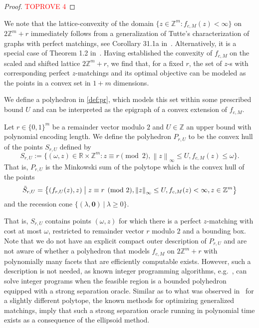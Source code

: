 \documentclass[a4paper,UKenglish,cleveref,thm-restate]{lipics-v2021}
\newcommand{\R}{\mathbb R}
\newcommand{\Z}{\mathbb Z}
\newcommand{\veczero}{\mathbf0}
\begin{document}
{\begin{proof}\textcolor{red}{TOPROVE 4}\end{proof}

We note that the lattice-convexity of the domain $\{z\in\Z^m\colon f_{c,M}(z)<\infty\}$ on $2\Z^m+r$ immediately follows from a generalization of Tutte's characterization of graphs with perfect matchings, see Corollary 31.1a in~\cite{schrijver2003combinatorial}. Alternatively, it is a special case of Theorem 1.2 in~\cite{DBLP:journals/jgt/AnsteeN99}. 
Having established the convexity of $f_{c,M}$ on the scaled and shifted lattice $2\Z^m+r$, we find that, for a fixed $r$, the set of $z$-s with corresponding perfect $z$-matchings and its optimal objective can be modeled as the points in a convex set in $1+m$ dimensions. 

}

We define a polyhedron in \cref{def:pr}, which models this set within some prescribed bound $U$ and can be interpreted as the epigraph of a convex extension of $f_{c,M}$.

\begin{definition}
    Let $r\in\{0,1\}^m$ be a remainder vector modulo $2$ and $U\in\Z$ an upper bound with polynomial encoding length. We define the polyhedron $P_{r,U}$ to be the convex hull of the points $S_{r,U}$ defined by
    \[
        S_{r,U}:=\bigl\{(\omega,z)\in\R\times\Z^m\colon z\equiv r\pmod2,\left\|z\right\|_\infty\le U,f_{c,M}(z)\le\omega\bigr\}.
    \]
    That is, $P_{r,U}$ is the Minkowski sum of the polytope which is the convex hull of the points
    \[
        \tilde S_{r,U}=\bigl\{(f_{r,U}(z),z)\bigm\vert z\equiv r\pmod2,\left\|z\right\|_\infty\le U,f_{c,M}(z)<\infty,z\in\Z^m\bigr\}
    \]
    and the recession cone $\{(\lambda,\veczero)\ \vert\ \lambda\ge0\}$.
    \label{def:pr}
\end{definition}

That is, $S_{r,U}$ contains points $(\omega,z)$ for which there is a perfect $z$-matching with cost at most $\omega$, restricted to remainder vector $r$ modulo $2$ and a bounding box. Note that we do not have an explicit compact outer description of $P_{r,U}$ and are not aware of whether a polyhedron that models $f_{c,M}$ on $2\Z^m+r$ with polynomially many facets that are efficiently computable exists. However, such a description is not needed, as known integer programming algorithms, e.g.~\cite{DBLP:conf/focs/ReisR23,DBLP:journals/mor/Lenstra83}, can solve integer programs when the feasible region is a bounded polyhedron equipped with a strong separation oracle. Similar as to what was observed in~\cite{DBLP:journals/mor/Zhang03} for a slightly different polytope, the known methods for optimizing generalized matchings, imply that such a strong separation oracle running in polynomial time exists as a consequence of the ellipsoid method.
\end{document}
